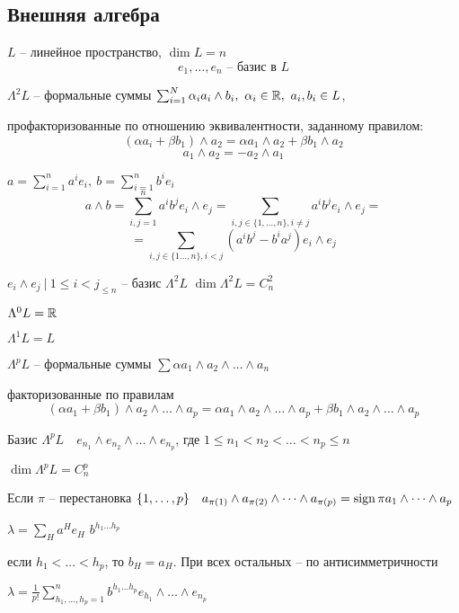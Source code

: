     \subsection*{Внешняя алгебра}

    $L$ -- линейное пространство, $\dim L = n$
    \[
        e_1, \dots, e_n \text{ -- базис в } L   
    \]
    \par $\Lambda^2 L$ -- формальные суммы $\sum_{i=1}^N \alpha_i a_i \wedge b_i, \ \alpha_i \in \mathbb{R}, \ a_i, b_i \in L$,
    \par \quad профакторизованные по отношению эквивалентности, заданному правилом:
    \[
        (\alpha a_i + \beta b_1) \wedge a_2 = \alpha a_1 \wedge a_2 + \beta b_1 \wedge a_2   
    \]
    \[
        a_1 \wedge a_2 = -a_2 \wedge a_1
    \]
    
    \par $a = \sum_{i=1}^n a^i e_i, \ b = \sum_{i=1}^n b^i e_i$
    \[
        a \wedge b = \sum_{i, j = 1}^n a^i b^j e_i \wedge e_j  = \sum_{i, j \in \{1, \dots, n \}, i \not= j} a^ib^j e_i \wedge e_j =  
    \]
    \[
        = \sum_{i, j \in \{1 \dots, n\}, i < j} (a^ib^j - b^i a^j) e_i \wedge e_j    
    \]

    \par $e_i \wedge e_j \ | \ 1 \le i < j_{\le n}$ -- базис $\Lambda^2 L$ \quad $\dim \Lambda^2 L = C_n^2$

    \par $\Lambda^0 L = \mathbb{R}$
    \par $\Lambda^1 L = L$
    \par $\Lambda^p L$ -- формальные суммы $\sum \alpha a_1 \wedge a_2 \wedge \dots \wedge a_n$
    \par \quad факторизованные по правилам
    \[
        (\alpha a_1 + \beta b_1)\wedge a_2 \wedge \dots \wedge a_p = \alpha a_1 \wedge a_2 \wedge \dots \wedge a_p + \beta b_1 \wedge a_2 \wedge \dots \wedge a_p    
    \]

    \par Базис $\Lambda^p L \quad e_{n_1} \wedge e_{n_2} \wedge \dots \wedge e_{n_p}$, где $1 \le n_1 < n_2 < \dots < n_p \le n$ 
    \par $\dim \Lambda^p L = C_n^p$
    \par Если $\pi$ -- перестановка $\{1, \dots, p\} \quad a_{\pi(1)} \wedge a_{\pi(2)} \wedge \dots \wedge a_{\pi(p)} = \operatorname{sign} \pi a_1 \wedge \dots \wedge a_p$

    \par $\lambda = \sum_H a^H e_H$ \quad $b^{h_1 \dots h_p}$
    \par если $h_1 < \dots < h_p$, то $b_H = a_H$. При всех остальных -- по антисимметричности
    \par $\lambda = \frac{1}{p!} \sum_{h_1, \dots, h_p = 1}^n b^{h_1 \dots h_p} e_{h_1} \wedge \dots \wedge e_{n_p}$

